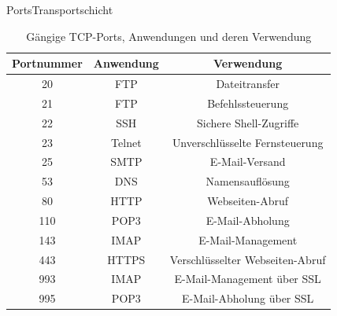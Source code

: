 \begin{frame}[fragile]{\faShip{} Ports}{Transportschicht}
\begin{table}[H]
    \centering
    \begin{tabular}{ccc}
    \toprule
    \textbf{Portnummer} & \textbf{Anwendung} & \textbf{Verwendung} \\
    \midrule
    20 & FTP & Dateitransfer \\
    21 & FTP & Befehlssteuerung \\
    22 & SSH & Sichere Shell-Zugriffe \\
    23 & Telnet & Unverschlüsselte Fernsteuerung \\
    25 & SMTP & E-Mail-Versand \\
    53 & DNS & Namensauflösung \\
    80 & HTTP & Webseiten-Abruf \\
    110 & POP3 & E-Mail-Abholung \\
    143 & IMAP & E-Mail-Management \\
    443 & HTTPS & Verschlüsselter Webseiten-Abruf \\
    993 & IMAP & E-Mail-Management über SSL \\
    995 & POP3 & E-Mail-Abholung über SSL \\
    \bottomrule
    \end{tabular}
    \caption*{Gängige TCP-Ports, Anwendungen und deren Verwendung}
\end{table}
\end{frame}

